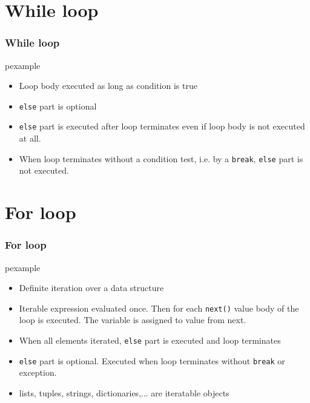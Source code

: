 \documentclass[trans,compress,xcolor=table]{beamer}
\begin{document}
\section{While loop}

\begin{frame}
\frametitle{While loop}
\begin{beamercolorbox}{pexample}
\codewhile
\end{beamercolorbox}
\begin{itemize}
\item Loop body executed as long as condition is true
 \item \lstinline!else! part is optional
\item \lstinline!else! part is executed after loop terminates even if loop body is not executed at all.
\item When loop terminates without a condition test, i.e. by a \lstinline!break!,
	\lstinline!else! part is not executed.
\end{itemize}
\end{frame}
\section{For loop}

\begin{frame}
\frametitle{For loop}
\begin{beamercolorbox}{pexample}
\codefor
\end{beamercolorbox}
\begin{itemize}
\item Definite iteration over  a data structure
\item Iterable expression evaluated once. Then for each \lstinline!next()! value
     body of the loop is executed. The variable is assigned to value from next.
\item When all elements iterated, \lstinline!else! part is
 executed and loop terminates
 \item \lstinline!else! part is optional. Executed when loop terminates without \lstinline!break! or exception.
 \item lists, tuples, strings, dictionaries,... are iteratable objects
\end{itemize}
\end{frame}
\end{document}
